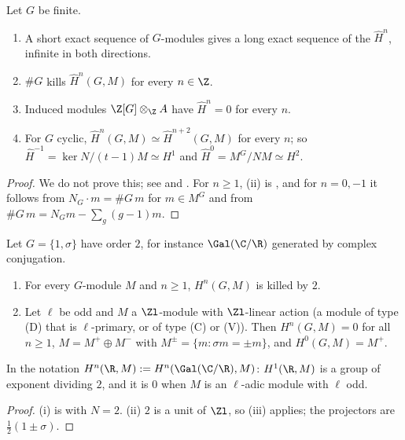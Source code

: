 \begin{proposition}\label{prop:cohomology:tate}
Let $G$ be finite.
\begin{enumerate}[label=(\roman*)]
\item A short exact sequence of $G$-modules gives a long exact sequence of the $\hat H^n$, infinite in both directions.
\item $\#G$ kills $\hat H^n(G,M)$ for every $n\in\Z$.
\item Induced modules $\Z[G]\otimes_\Z A$ have $\hat H^n=0$ for every $n$.
\item For $G$ cyclic, $\hat H^n(G,M)\simeq\hat H^{n+2}(G,M)$ for every $n$; so $\hat H^{-1}=\ker N/(t-1)M\simeq H^1$ and $\hat H^0=M^G/NM\simeq H^2$.
\end{enumerate}
\end{proposition}

\begin{proof}
We do not prove this; see \cite[Chapter VIII, Sections 1 to 4]{SerreLocalFields} and \cite[Chapter VI, Section 4]{Brown}. For $n\ge1$, (ii) is
, and for $n=0,-1$ it follows from $N_G\cdot m=\#G\,m$ for $m\in M^G$ and from $\#G\,m=N_Gm-\sum_g(g-1)m$.
\end{proof}

\begin{corollary}\label{cor:cohomology:z2}
Let $G=\{1,\sigma\}$ have order $2$, for instance $\Gal(\C/\R)$ generated by complex conjugation.
\begin{enumerate}[label=(\roman*)]
\item For every $G$-module $M$ and $n\ge1$, $H^n(G,M)$ is killed by $2$.
\item Let $\ell$ be odd and $M$ a $\Zl$-module with $\Zl$-linear action (a module of type (D) that is $\ell$-primary, or of type (C) or (V)). Then $H^n(G,M)=0$
for all $n\ge1$, $M=M^+\oplus M^-$ with $M^\pm=\{m:\sigma m=\pm m\}$, and $H^0(G,M)=M^+$.
\end{enumerate}
In the notation $H^n(\R,M):=H^n(\Gal(\C/\R),M)$: $H^1(\R,M)$ is a group of exponent dividing $2$, and it is $0$ when $M$ is an $\ell$-adic module with $\ell$ odd.
\end{corollary}

\begin{proof}
(i) is  with $N=2$. (ii) $2$ is a unit of $\Zl$, so (iii) applies; the projectors are
$\frac12(1\pm\sigma)$.
\end{proof}

